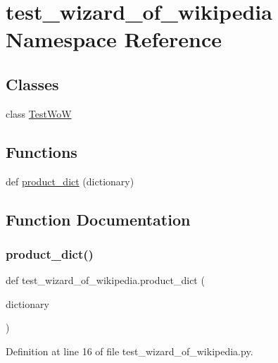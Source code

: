 \hypertarget{namespacetest__wizard__of__wikipedia}{}\section{test\+\_\+wizard\+\_\+of\+\_\+wikipedia Namespace Reference}
\label{namespacetest__wizard__of__wikipedia}
\subsection*{Classes}
\begin{DoxyCompactItemize}
\item 
class \hyperlink{classtest__wizard__of__wikipedia_1_1TestWoW}{Test\+WoW}
\end{DoxyCompactItemize}
\subsection*{Functions}
\begin{DoxyCompactItemize}
\item 
def \hyperlink{namespacetest__wizard__of__wikipedia_a164c55752f617c13303f14f70ac90b0c}{product\+\_\+dict} (dictionary)
\end{DoxyCompactItemize}


\subsection{Function Documentation}
\mbox{\label{namespacetest__wizard__of__wikipedia_a164c55752f617c13303f14f70ac90b0c}} 
\subsubsection{\texorpdfstring{product\+\_\+dict()}{product\_dict()}}
{\footnotesize\ttfamily def test\+\_\+wizard\+\_\+of\+\_\+wikipedia.\+product\+\_\+dict (\begin{DoxyParamCaption}\item[{}]{dictionary }\end{DoxyParamCaption})}



Definition at line 16 of file test\+\_\+wizard\+\_\+of\+\_\+wikipedia.\+py.



